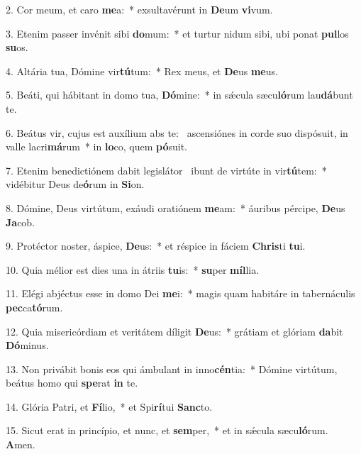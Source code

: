 2. Cor meum, et caro \textbf{me}a:~*  exsultavérunt in \textbf{De}um \textbf{vi}vum.\

3. Etenim passer invénit sibi \textbf{do}mum:~*  et turtur nidum sibi, ubi ponat \textbf{pul}los \textbf{su}os.\

4. Altária tua, Dómine vir\textbf{tú}tum:~*  Rex meus, et \textbf{De}us \textbf{me}us.\

5. Beáti, qui hábitant in domo tua, \textbf{Dó}mine:~*  in sǽcula sæcu\textbf{ló}rum lau\textbf{dá}bunt te.\

6. Beátus vir, cujus est auxílium abs te: \dag\  ascensiónes in corde suo dispósuit, in valle lacri\textbf{má}rum~*  in \textbf{lo}co, quem \textbf{pó}suit.\

7. Etenim benedictiónem dabit legislátor \dag\  ibunt de virtúte in vir\textbf{tú}tem:~*  vidébitur Deus de\textbf{ó}rum in \textbf{Si}on.\

8. Dómine, Deus virtútum, exáudi oratiónem \textbf{me}am:~*  áuribus pércipe, \textbf{De}us \textbf{Ja}cob.\

9. Protéctor noster, áspice, \textbf{De}us:~*  et réspice in fáciem \textbf{Chris}ti \textbf{tu}i.\

10. Quia mélior est dies una in átriis \textbf{tu}is:~*  \textbf{su}per \textbf{míl}lia.\

11. Elégi abjéctus esse in domo Dei \textbf{me}i:~*  magis quam habitáre in tabernáculis \textbf{pec}ca\textbf{tó}rum.\

12. Quia misericórdiam et veritátem díligit \textbf{De}us:~*  grátiam et glóriam \textbf{da}bit \textbf{Dó}minus.\

13. Non privábit bonis eos qui ámbulant in inno\textbf{cén}tia:~*  Dómine virtútum, beátus homo qui \textbf{spe}rat \textbf{in} te.\

14. Glória Patri, et \textbf{Fí}lio,~*  et Spi\textbf{rí}tui \textbf{Sanc}to.\

15. Sicut erat in princípio, et nunc, et \textbf{sem}per,~*  et in sǽcula sæcu\textbf{ló}rum. \textbf{A}men.\

